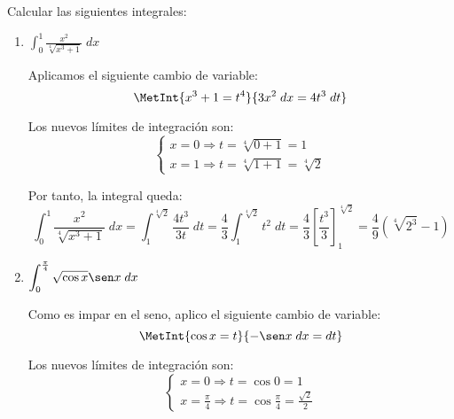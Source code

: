\begin{ejercicio}
    Calcular las siguientes integrales:
    \begin{enumerate}
        \item $\displaystyle \int_0^1 \frac{x^2}{\sqrt[4]{x^3+1}}\;dx$
        
        Aplicamos el siguiente cambio de variable:
        \begin{equation*}
            \MetInt{x^3+1=t^4}{3x^2\;dx=4t^3\;dt}
        \end{equation*}

        Los nuevos límites de integración son:
        \begin{equation*}
            \left\{\begin{array}{l}
                x=0 \Longrightarrow t=\sqrt[4]{0+1} =1 \\
                x=1 \Longrightarrow t=\sqrt[4]{1+1} =\sqrt[4]{2}
            \end{array}\right.
        \end{equation*}

        Por tanto, la integral queda:
        \begin{equation*}
            \int_0^1 \frac{x^2}{\sqrt[4]{x^3+1}}\;dx
            = \int_1^{\sqrt[4]{2}} \frac{4t^3}{3t}\;dt
            = \frac{4}{3}\int_1^{\sqrt[4]{2}} t^2\;dt
            = \frac{4}{3}\left[\frac{t^3}{3}\right]_1^{\sqrt[4]{2}}
            = \frac{4}{9}\left(\sqrt[4]{2^3}- 1\right)
        \end{equation*}

        \item $\displaystyle \int_0^\frac{\pi}{4} \sqrt{\cos x}\sen x\;dx$
        
        Como es impar en el seno, aplico el siguiente cambio de variable:
        \begin{equation*}
            \MetInt{\cos x =t}{-\sen x\;dx = dt}
        \end{equation*}

        Los nuevos límites de integración son:
        \begin{equation*}
            \left\{\begin{array}{l}
                x=0 \Longrightarrow t=\cos 0 =1 \\
                x=\frac{\pi}{4} \Longrightarrow t=\cos \frac{\pi}{4} =\frac{\sqrt{2}}{2}
            \end{array}\right.
        \end{equation*}


\end{enumerate}
\end{ejercicio}
